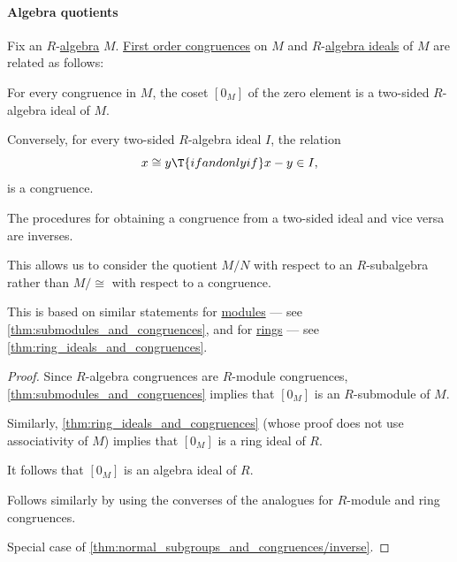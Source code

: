 \paragraph{Algebra quotients}

\begin{proposition}\label{thm:algebra_ideals_and_congruences}
  Fix an \( R \)-\hyperref[def:algebra_over_ring]{algebra} \( M \). \hyperref[def:fol_congruence]{First order congruences} on \( M \) and \( R \)-\hyperref[def:algebra_over_ring/ideal]{algebra ideals} of \( M \) are related as follows:
  \begin{thmenum}
     For every congruence in \( M \), the coset \( [0_M] \) of the zero element is a two-sided \( R \)-algebra ideal of \( M \).

     Conversely, for every two-sided \( R \)-algebra ideal \( I \), the relation
    \begin{equation}\label{eq:thm:algebra_ideals_and_congruences/subalgebra_to_cong}
      x \cong y \T{if and only if} x - y \in I,
    \end{equation}
    is a congruence.

     The procedures for obtaining a congruence from a two-sided ideal and vice versa are inverses.
  \end{thmenum}
\end{proposition}
\begin{comments}
  \item This allows us to consider the quotient \( M / N \) with respect to an \( R \)-subalgebra rather than \( M / {\cong} \) with respect to a congruence.

  \item This is based on similar statements for \hyperref[def:module]{modules} --- see \cref{thm:submodules_and_congruences}, and for \hyperref[def:ring]{rings} --- see \cref{thm:ring_ideals_and_congruences}.
\end{comments}
\begin{proof}
   Since \( R \)-algebra congruences are \( R \)-module congruences, \cref{thm:submodules_and_congruences} implies that \( [0_M] \) is an \( R \)-submodule of \( M \).

  Similarly, \cref{thm:ring_ideals_and_congruences} (whose proof does not use associativity of \( M \)) implies that \( [0_M] \) is a ring ideal of \( R \).

  It follows that \( [0_M] \) is an algebra ideal of \( R \).

   Follows similarly by using the converses of the analogues for \( R \)-module and ring congruences.

   Special case of \cref{thm:normal_subgroups_and_congruences/inverse}.
\end{proof}

